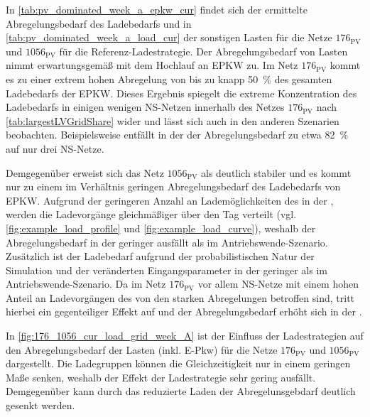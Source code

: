 



In \autoref{tab:pv_dominated_week_a_epkw_cur} findet sich der ermittelte Abregelungsbedarf des Ladebedarfs und in \autoref{tab:pv_dominated_week_a_load_cur} der sonstigen Lasten für die Netze \(176_{\text{PV}}\) und \(1056_{\text{PV}}\) für die Referenz-Ladestrategie.
Der Abregelungsbedarf von Lasten nimmt erwartungsgemäß mit dem Hochlauf an \gls{EPKW} zu.
Im Netz \(176_{\text{PV}}\) kommt es zu einer extrem hohen Abregelung von bis zu knapp \SI{50}{\percent} des gesamten Ladebedarfs der \gls{EPKW}.
Dieses Ergebnis spiegelt die extreme Konzentration des Ladebedarfs in einigen wenigen \gls{NS}-Netzen innerhalb des Netzes \(176_{\text{PV}}\) nach \autoref{tab:largestLVGridShare} wider und lässt sich auch in den anderen Szenarien beobachten.
Beispielsweise entfällt in der \SzeFirmenparkplatz der Abregelungsbedarf zu etwa \SI{82}{\percent} auf nur drei \gls{NS}-Netze.\medskip

Demgegenüber erweist sich das Netz \(1056_{\text{PV}}\) als deutlich stabiler und es kommt nur zu einem im Verhältnis geringen Abregelungsbedarf des Ladebedarfs von \gls{EPKW}.
Aufgrund der geringeren Anzahl an Lademöglichkeiten des \UC \Firmeparkplatz in der \SzeFirmenparkplatzdot, werden die Ladevorgänge gleichmäßiger über den Tag verteilt (vgl. \autoref{fig:example_load_profile} und \autoref{fig:example_load_curve}), weshalb der Abregelungsbedarf in der \SzeFirmenparkplatz geringer ausfällt als im Antriebswende-Szenario.
Zusätzlich ist der Ladebedarf aufgrund der probabilistischen Natur der Simulation und der veränderten Eingangsparameter in der \SzeFirmenparkplatz geringer als im Antriebswende-Szenario.
Da im Netz \(176_{\text{PV}}\) vor allem \gls{NS}-Netze mit einem hohen Anteil an Ladevorgängen des \UC \zH von den starken Abregelungen betroffen sind, tritt hierbei ein gegenteiliger Effekt auf und der Abregelungsbedarf erhöht sich in der \SzeFirmenparkplatzdot.





In \autoref{fig:176_1056_cur_load_grid_week_A} ist der Einfluss der Ladestrategien auf den Abregelungsbedarf der Lasten (inkl. E-Pkw) für die Netze \(176_{\text{PV}}\) und \(1056_{\text{PV}}\) dargestellt.
Die Ladegruppen können die Gleichzeitigkeit nur in einem geringen Maße senken, weshalb der Effekt der Ladestrategie sehr gering ausfällt.
Demgegenüber kann durch das reduzierte Laden der Abregelunsgebdarf deutlich gesenkt werden.


